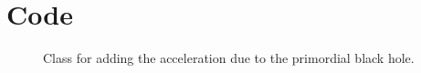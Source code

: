 \documentclass[10pt]{article}
\begin{document}
\lstset{style=mystyle}

\section{Code}

\begin{figure}[htbp]

\caption{Class for adding the acceleration due to the primordial black hole.}
\label{fig:blackholeclass}
\end{figure}
\end{document}
